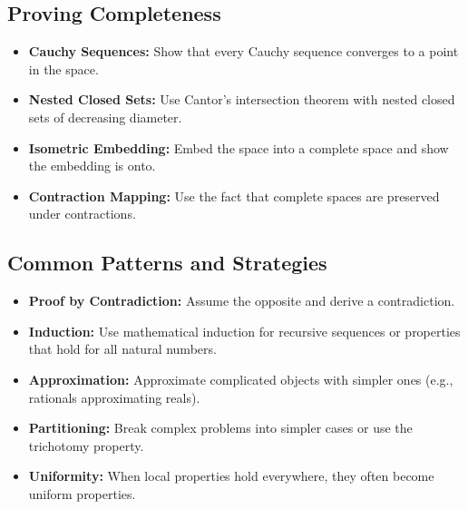 \subsection*{Proving Completeness}

\begin{itemize}
\item \textbf{Cauchy Sequences:} Show that every Cauchy sequence converges to a point in the space.

\item \textbf{Nested Closed Sets:} Use Cantor's intersection theorem with nested closed sets of decreasing diameter.

\item \textbf{Isometric Embedding:} Embed the space into a complete space and show the embedding is onto.

\item \textbf{Contraction Mapping:} Use the fact that complete spaces are preserved under contractions.
\end{itemize}

\subsection*{Common Patterns and Strategies}

\begin{itemize}
\item \textbf{Proof by Contradiction:} Assume the opposite and derive a contradiction.

\item \textbf{Induction:} Use mathematical induction for recursive sequences or properties that hold for all natural numbers.

\item \textbf{Approximation:} Approximate complicated objects with simpler ones (e.g., rationals approximating reals).

\item \textbf{Partitioning:} Break complex problems into simpler cases or use the trichotomy property.

\item \textbf{Uniformity:} When local properties hold everywhere, they often become uniform properties.
\end{itemize}
